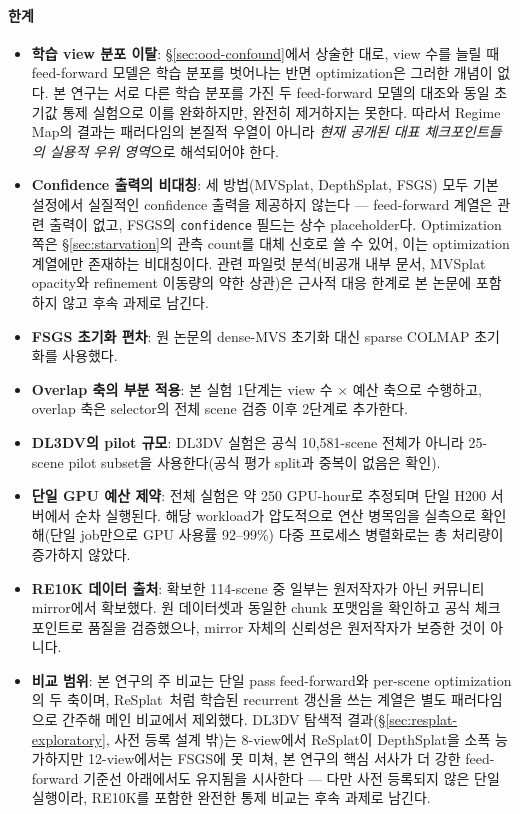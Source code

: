 \paragraph{한계}
\begin{itemize}
  \item \textbf{학습 view 분포 이탈}: \S\ref{sec:ood-confound}에서 상술한 대로, view 수를 늘릴 때 feed-forward 모델은 학습 분포를 벗어나는 반면 optimization은 그러한 개념이 없다. 본 연구는 서로 다른 학습 분포를 가진 두 feed-forward 모델의 대조와 동일 초기값 통제 실험으로 이를 완화하지만, 완전히 제거하지는 못한다. 따라서 Regime Map의 결과는 패러다임의 본질적 우열이 아니라 \emph{현재 공개된 대표 체크포인트들의 실용적 우위 영역}으로 해석되어야 한다.
  \item \textbf{Confidence 출력의 비대칭}: 세 방법(MVSplat, DepthSplat, FSGS) 모두 기본 설정에서 실질적인 confidence 출력을 제공하지 않는다 — feed-forward 계열은 관련 출력이 없고, FSGS의 \texttt{confidence} 필드는 상수 placeholder다. Optimization 쪽은 \S\ref{sec:starvation}의 관측 count를 대체 신호로 쓸 수 있어, 이는 optimization 계열에만 존재하는 비대칭이다. 관련 파일럿 분석(비공개 내부 문서, MVSplat opacity와 refinement 이동량의 약한 상관)은 근사적 대응 한계로 본 논문에 포함하지 않고 후속 과제로 남긴다.
  \item \textbf{FSGS 초기화 편차}: 원 논문의 dense-MVS 초기화 대신 sparse COLMAP 초기화를 사용했다. 
  \item \textbf{Overlap 축의 부분 적용}: 본 실험 1단계는 view 수 $\times$ 예산 축으로 수행하고, overlap 축은 selector의 전체 scene 검증 이후 2단계로 추가한다.
  \item \textbf{DL3DV의 pilot 규모}: DL3DV 실험은 공식 10{,}581-scene 전체가 아니라 25-scene pilot subset을 사용한다(공식 평가 split과 중복이 없음은 확인).
  \item \textbf{단일 GPU 예산 제약}: 전체 실험은 약 250 GPU-hour로 추정되며 단일 H200 서버에서 순차 실행된다. 해당 workload가 압도적으로 연산 병목임을 실측으로 확인해(단일 job만으로 GPU 사용률 92--99\%) 다중 프로세스 병렬화로는 총 처리량이 증가하지 않았다.
  \item \textbf{RE10K 데이터 출처}: 확보한 114-scene 중 일부는 원저작자가 아닌 커뮤니티 mirror에서 확보했다. 원 데이터셋과 동일한 chunk 포맷임을 확인하고 공식 체크포인트로 품질을 검증했으나, mirror 자체의 신뢰성은 원저작자가 보증한 것이 아니다.
  \item \textbf{비교 범위}: 본 연구의 주 비교는 단일 pass feed-forward와 per-scene optimization의 두 축이며, ReSplat~\cite{xu2026resplat}처럼 학습된 recurrent 갱신을 쓰는 계열은 별도 패러다임으로 간주해 메인 비교에서 제외했다. DL3DV 탐색적 결과(\S\ref{sec:resplat-exploratory}, 사전 등록 설계 밖)는 8-view에서 ReSplat이 DepthSplat을 소폭 능가하지만 12-view에서는 FSGS에 못 미쳐, 본 연구의 핵심 서사가 더 강한 feed-forward 기준선 아래에서도 유지됨을 시사한다 — 다만 사전 등록되지 않은 단일 실행이라, RE10K를 포함한 완전한 통제 비교는 후속 과제로 남긴다.
\end{itemize}
